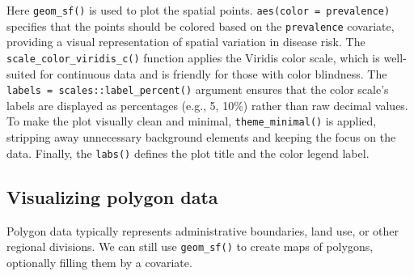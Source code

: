 \documentclass[
  letterpaper,
]{krantz}
\newenvironment{Shaded}{\begin{snugshade}}{\end{snugshade}}
\newcommand{\AttributeTok}[1]{\textcolor[rgb]{0.13,0.29,0.53}{#1}}
\newcommand{\CommentTok}[1]{\textcolor[rgb]{0.56,0.35,0.01}{\textit{#1}}}
\newcommand{\DecValTok}[1]{\textcolor[rgb]{0.00,0.00,0.81}{#1}}
\newcommand{\FunctionTok}[1]{\textcolor[rgb]{0.13,0.29,0.53}{\textbf{#1}}}
\newcommand{\NormalTok}[1]{#1}
\newcommand{\OtherTok}[1]{\textcolor[rgb]{0.56,0.35,0.01}{#1}}
\newcommand{\SpecialCharTok}[1]{\textcolor[rgb]{0.81,0.36,0.00}{\textbf{#1}}}
\newcommand{\StringTok}[1]{\textcolor[rgb]{0.31,0.60,0.02}{#1}}
\begin{document}
Here \texttt{geom\_sf()} is used to plot the spatial points.
\texttt{aes(color\ =\ prevalence)} specifies that the points should be
colored based on the \texttt{prevalence} covariate, providing a visual
representation of spatial variation in disease risk. The
\texttt{scale\_color\_viridis\_c()} function applies the Viridis color
scale, which is well-suited for continuous data and is friendly for
those with color blindness. The
\texttt{labels\ =\ scales::label\_percent()} argument ensures that the
color scale's labels are displayed as percentages (e.g., 5, 10\%) rather
than raw decimal values. To make the plot visually clean and minimal,
\texttt{theme\_minimal()} is applied, stripping away unnecessary
background elements and keeping the focus on the data. Finally, the
\texttt{labs()} defines the plot title and the color legend label.

\subsection{Visualizing polygon data}\label{visualizing-polygon-data}

Polygon data typically represents administrative boundaries, land use,
or other regional divisions. We can still use \texttt{geom\_sf()} to
create maps of polygons, optionally filling them by a covariate.

\begin{Shaded}
\end{Shaded}
\end{document}

